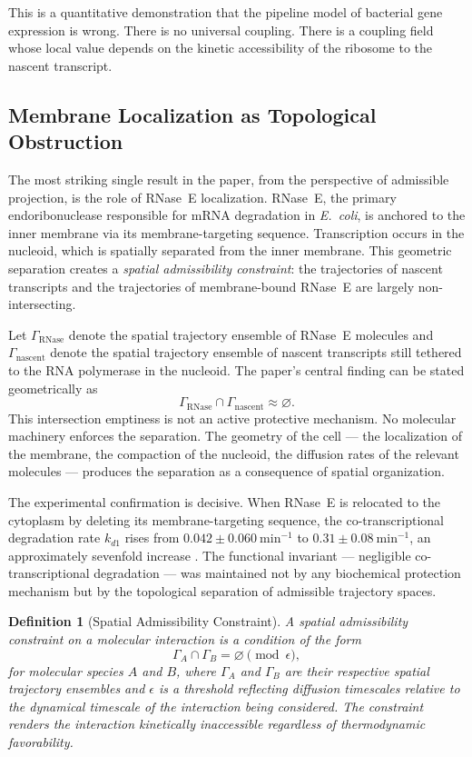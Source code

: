 \documentclass[12pt, a4paper]{article}
\theoremstyle{essaystyle}
\newtheorem{definition}{Definition}
\begin{document}
This is a quantitative demonstration that the pipeline model of bacterial gene
expression is wrong. There is no universal coupling. There is a coupling field whose
local value depends on the kinetic accessibility of the ribosome to the nascent
transcript.

\subsection{Membrane Localization as Topological Obstruction}

The most striking single result in the paper, from the perspective of admissible
projection, is the role of RNase~E localization. RNase~E, the primary endoribonuclease
responsible for mRNA degradation in \textit{E.~coli}, is anchored to the inner membrane
via its membrane-targeting sequence. Transcription occurs in the nucleoid, which is
spatially separated from the inner membrane. This geometric separation creates a
\emph{spatial admissibility constraint}: the trajectories of nascent transcripts and the
trajectories of membrane-bound RNase~E are largely non-intersecting.

Let $\Gamma_{\mathrm{RNase}}$ denote the spatial trajectory ensemble of RNase~E
molecules and $\Gamma_{\mathrm{nascent}}$ denote the spatial trajectory ensemble of
nascent transcripts still tethered to the RNA polymerase in the nucleoid. The paper's
central finding can be stated geometrically as
\[
\Gamma_{\mathrm{RNase}} \cap \Gamma_{\mathrm{nascent}} \approx \varnothing.
\]
This intersection emptiness is not an active protective mechanism. No molecular
machinery enforces the separation. The geometry of the cell --- the localization of the
membrane, the compaction of the nucleoid, the diffusion rates of the relevant molecules
--- produces the separation as a consequence of spatial organization.

The experimental confirmation is decisive. When RNase~E is relocated to the cytoplasm
by deleting its membrane-targeting sequence, the co-transcriptional degradation rate
$k_{d1}$ rises from $0.042 \pm 0.060 \ \mathrm{min}^{-1}$ to $0.31 \pm 0.08 \
\mathrm{min}^{-1}$, an approximately sevenfold increase \citep{kim2026spatial}. The
functional invariant --- negligible co-transcriptional degradation --- was maintained
not by any biochemical protection mechanism but by the topological separation of
admissible trajectory spaces.

\begin{definition}[Spatial Admissibility Constraint]
A \emph{spatial admissibility constraint} on a molecular interaction is a condition of
the form
\[
\Gamma_A \cap \Gamma_B = \varnothing \pmod{\epsilon},
\]
for molecular species $A$ and $B$, where $\Gamma_A$ and $\Gamma_B$ are their respective
spatial trajectory ensembles and $\epsilon$ is a threshold reflecting diffusion
timescales relative to the dynamical timescale of the interaction being considered. The
constraint renders the interaction kinetically inaccessible regardless of thermodynamic
favorability.
\end{definition}
\end{document}
